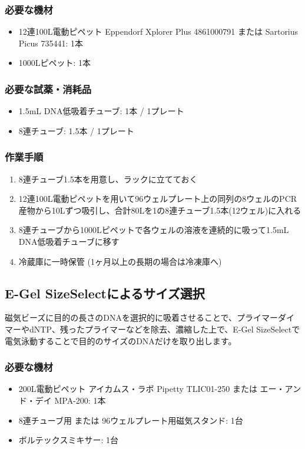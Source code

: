 \documentclass[titlepage,10pt,a4paper]{jsbook}
\begin{document}
\subsubsection{必要な機材}
\begin{itemize}
\item 12連100{\textmu}L電動ピペット Eppendorf Xplorer Plus 4861000791 または Sartorius Picus 735441: 1本
\item 1000{\textmu}Lピペット: 1本
\end{itemize}

\subsubsection{必要な試薬・消耗品}
\begin{itemize}
\item 1.5mL DNA低吸着チューブ: 1本 / 1プレート
\item 8連チューブ: 1.5本 / 1プレート
\end{itemize}

\subsubsection{作業手順}
\begin{enumerate}
\item 8連チューブ1.5本を用意し、ラックに立てておく
\item 12連100{\textmu}L電動ピペットを用いて96ウェルプレート上の同列の8ウェルのPCR産物から10{\textmu}Lずつ吸引し、合計80{\textmu}Lを1の8連チューブ1.5本(12ウェル)に入れる
\item 8連チューブから1000{\textmu}Lピペットで各ウェルの溶液を連続的に吸って1.5mL DNA低吸着チューブに移す
\item 冷蔵庫に一時保管 (1ヶ月以上の長期の場合は冷凍庫へ)
\end{enumerate}

\subsection{E-Gel SizeSelectによるサイズ選択}

磁気ビーズに目的の長さのDNAを選択的に吸着させることで、プライマーダイマーやdNTP、残ったプライマーなどを除去、濃縮した上で、E-Gel SizeSelectで電気泳動することで目的のサイズのDNAだけを取り出します。

\subsubsection{必要な機材}
\begin{itemize}
\item 200{\textmu}L電動ピペット アイカムス・ラボ Pipetty TLIC01-250 または エー・アンド・デイ MPA-200: 1本
\item 8連チューブ用 または 96ウェルプレート用磁気スタンド: 1台
\item ボルテックスミキサー: 1台
\end{itemize}
\end{document}
